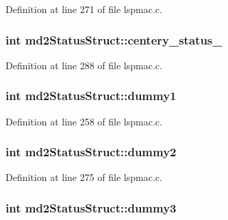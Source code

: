 Definition at line 271 of file lspmac.\-c.

\hypertarget{structmd2StatusStruct_aa242098c185cce8f852cd6e081ef0b1d}{
\subsubsection[{centery\-\_\-status\-\_\-2}]{\setlength{\rightskip}{0pt plus 5cm}int md2\-Status\-Struct\-::centery\-\_\-status\-\_}}\label{structmd2StatusStruct_aa242098c185cce8f852cd6e081ef0b1d}


Definition at line 288 of file lspmac.\-c.

\hypertarget{structmd2StatusStruct_a3a2dff3e6a1a346806a655e8404e0f53}{
\subsubsection[{dummy1}]{\setlength{\rightskip}{0pt plus 5cm}int md2\-Status\-Struct\-::dummy1}}\label{structmd2StatusStruct_a3a2dff3e6a1a346806a655e8404e0f53}


Definition at line 258 of file lspmac.\-c.

\hypertarget{structmd2StatusStruct_a4df936acc498498baba111edb82597a1}{
\subsubsection[{dummy2}]{\setlength{\rightskip}{0pt plus 5cm}int md2\-Status\-Struct\-::dummy2}}\label{structmd2StatusStruct_a4df936acc498498baba111edb82597a1}


Definition at line 275 of file lspmac.\-c.

\hypertarget{structmd2StatusStruct_adb2dc5bdbf99def51018558201508009}{
\subsubsection[{dummy3}]{\setlength{\rightskip}{0pt plus 5cm}int md2\-Status\-Struct\-::dummy3}}\label{structmd2StatusStruct_adb2dc5bdbf99def51018558201508009}



